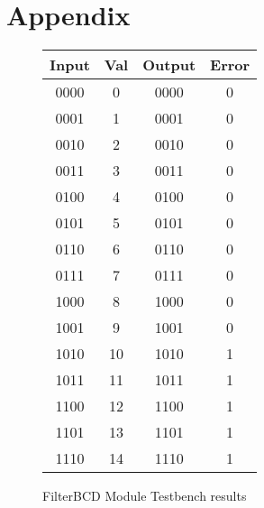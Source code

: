 \newpage
{}
\section{Appendix}

\begin{figure}[h]
\centering
\begin{tabular}{|c|c|c|c|}
\hline
Input&Val&Output&Error\\
\hline
0000&0&0000&0\\
0001&1&0001&0\\
0010&2&0010&0\\
0011&3&0011&0\\
0100&4&0100&0\\
0101&5&0101&0\\
0110&6&0110&0\\
0111&7&0111&0\\
1000&8&1000&0\\
1001&9&1001&0\\
1010&10&1010&1\\
1011&11&1011&1\\
1100&12&1100&1\\
1101&13&1101&1\\
1110&14&1110&1\\
\hline
\end{tabular}
\caption{FilterBCD Module Testbench results}
\label {filter_tb}
\end{figure}

\